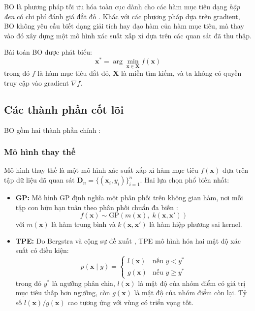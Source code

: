 BO là phương pháp tối ưu hóa toàn cục dành cho các hàm mục tiêu dạng \textit{hộp đen} có chi phí đánh giá đắt đỏ \cite{shahriari2016bo_survey}. Khác với các phương pháp dựa trên gradient, BO không yêu cầu biết dạng giải tích hay đạo hàm của hàm mục tiêu, mà thay vào đó xây dựng một mô hình xác suất xấp xỉ dựa trên các quan sát đã thu thập.

Bài toán BO được phát biểu:
\begin{equation}
    \mathbf{x}^* = \arg\min_{\mathbf{x} \in \mathbf{X}} f(\mathbf{x})
    \label{eq:bo_problem}
\end{equation}
\noindent trong đó $f$ là hàm mục tiêu đắt đỏ, $\mathbf{X}$ là miền tìm kiếm, và ta không có quyền truy cập vào gradient $\nabla f$.

\subsection{Các thành phần cốt lõi}

BO gồm hai thành phần chính \cite{frazier2018bo_tutorial}:

\subsubsection{Mô hình thay thế}

Mô hình thay thế là một mô hình xác suất xấp xỉ hàm mục tiêu $f(\mathbf{x})$ dựa trên tập dữ liệu đã quan sát $\mathbf{D}_n = \{(\mathbf{x}_i, y_i)\}_{i=1}^n$. Hai lựa chọn phổ biến nhất:

\begin{itemize}
    \item \textbf{GP:} Mô hình GP định nghĩa một phân phối trên không gian hàm, nơi mỗi tập con hữu hạn tuân theo phân phối chuẩn đa biến \cite{rasmussen2006gp}:
    \begin{equation}
        f(\mathbf{x}) \sim \mathrm{GP}\left(m(\mathbf{x}),\; k(\mathbf{x}, \mathbf{x}')\right)
    \end{equation}
    với $m(\mathbf{x})$ là hàm trung bình và $k(\mathbf{x}, \mathbf{x}')$ là hàm hiệp phương sai kernel.
    
    \item \textbf{TPE:} Do Bergstra và cộng sự đề xuất \cite{bergstra2011tpe}, TPE mô hình hóa hai mật độ xác suất có điều kiện:
    \begin{equation}
        p(\mathbf{x} \mid y) = \begin{cases}
            l(\mathbf{x}) & \text{nếu } y < y^* \\
            g(\mathbf{x}) & \text{nếu } y \geq y^*
        \end{cases}
        \label{eq:tpe}
    \end{equation}
    trong đó $y^*$ là ngưỡng phân chia, $l(\mathbf{x})$ là mật độ của nhóm điểm có giá trị mục tiêu thấp hơn ngưỡng, còn $g(\mathbf{x})$ là mật độ của nhóm điểm còn lại. Tỷ số $l(\mathbf{x})/g(\mathbf{x})$ cao tương ứng với vùng có triển vọng tốt.
\end{itemize}

